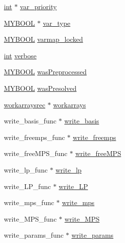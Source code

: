 \begin{DoxyCompactItemize}
\item 
\hyperlink{lp__lib_8h_adeb9ec6400320e4923ac9d836d509ddb}{int} $\ast$ \hyperlink{struct__lprec_aec4e79b3a1003361faf569b3058d31ca}{var\+\_\+priority}
\item 
\hyperlink{lp__lib_8h_aad848328fb3018217ac9f01d97b6bd88}{M\+Y\+B\+O\+OL} $\ast$ \hyperlink{struct__lprec_abc0923c29a9858012eafcf488b162157}{var\+\_\+type}
\item 
\hyperlink{lp__lib_8h_aad848328fb3018217ac9f01d97b6bd88}{M\+Y\+B\+O\+OL} \hyperlink{struct__lprec_ad34f8dd487991ec967e0335c8c4367e2}{varmap\+\_\+locked}
\item 
\hyperlink{lp__lib_8h_adeb9ec6400320e4923ac9d836d509ddb}{int} \hyperlink{struct__lprec_a0344b596f86b8816bb2302c50f6004f5}{verbose}
\item 
\hyperlink{lp__lib_8h_aad848328fb3018217ac9f01d97b6bd88}{M\+Y\+B\+O\+OL} \hyperlink{struct__lprec_a6e9befe9ae0aa68b899c6419e1716492}{was\+Preprocessed}
\item 
\hyperlink{lp__lib_8h_aad848328fb3018217ac9f01d97b6bd88}{M\+Y\+B\+O\+OL} \hyperlink{struct__lprec_a73a0b5185a95b845dc5e39c1e8bd6ec7}{was\+Presolved}
\item 
\hyperlink{lp__utils_8h_ae1acbc6dddf7681133805af55d6a6849}{workarraysrec} $\ast$ \hyperlink{struct__lprec_a1c560c27977b300b3fd89764b3ad5cc6}{workarrays}
\item 
write\+\_\+basis\+\_\+func $\ast$ \hyperlink{struct__lprec_a5fc7777f3e79a2c4b65f62e23307db8a}{write\+\_\+basis}
\item 
write\+\_\+freemps\+\_\+func $\ast$ \hyperlink{struct__lprec_a00dc181d40de6aff9a492c9c78a23c5a}{write\+\_\+freemps}
\item 
write\+\_\+free\+M\+P\+S\+\_\+func $\ast$ \hyperlink{struct__lprec_aa0d7fea7746f00dd0aa3eb8b8912797b}{write\+\_\+free\+M\+PS}
\item 
write\+\_\+lp\+\_\+func $\ast$ \hyperlink{struct__lprec_a762304e6e91842cfcc052d27f0042b31}{write\+\_\+lp}
\item 
write\+\_\+\+L\+P\+\_\+func $\ast$ \hyperlink{struct__lprec_a0c28f4dd36d38183ff012bfca011f0a7}{write\+\_\+\+LP}
\item 
write\+\_\+mps\+\_\+func $\ast$ \hyperlink{struct__lprec_aafd17232c9e77cd5ae317ba441ea8cfd}{write\+\_\+mps}
\item 
write\+\_\+\+M\+P\+S\+\_\+func $\ast$ \hyperlink{struct__lprec_a449c19419eb8345ff2a2d84c16fac22d}{write\+\_\+\+M\+PS}
\item 
write\+\_\+params\+\_\+func $\ast$ \hyperlink{struct__lprec_ae4f8600c9e714989f3af9591b066ca29}{write\+\_\+params}

\end{DoxyCompactItemize}
